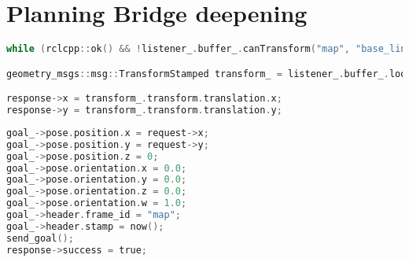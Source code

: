 \chapter{Planning Bridge deepening}
\label{cha:deepening}

\newsavebox\poseserver

\noindent\begin{lrbox}{\poseserver}
  \noindent\begin{lstlisting}[language=C, style=CStyleTextWidth]
while (rclcpp::ok() && !listener_.buffer_.canTransform("map", "base_link", tf2::TimePoint())) rate.sleep();

geometry_msgs::msg::TransformStamped transform_ = listener_.buffer_.lookupTransform("map", "base_link", tf2::TimePoint());

response->x = transform_.transform.translation.x;
response->y = transform_.transform.translation.y;
  \end{lstlisting}
\end{lrbox}

\newsavebox\navigationclient

\noindent\begin{lrbox}{\navigationclient}
  \noindent\begin{lstlisting}[language=C, style=CStyleNoFrame]
goal_->pose.position.x = request->x;
goal_->pose.position.y = request->y;
goal_->pose.position.z = 0;
goal_->pose.orientation.x = 0.0;
goal_->pose.orientation.y = 0.0;
goal_->pose.orientation.z = 0.0;
goal_->pose.orientation.w = 1.0;
goal_->header.frame_id = "map";
goal_->header.stamp = now();
send_goal();
response->success = true;
  \end{lstlisting}
\end{lrbox}

